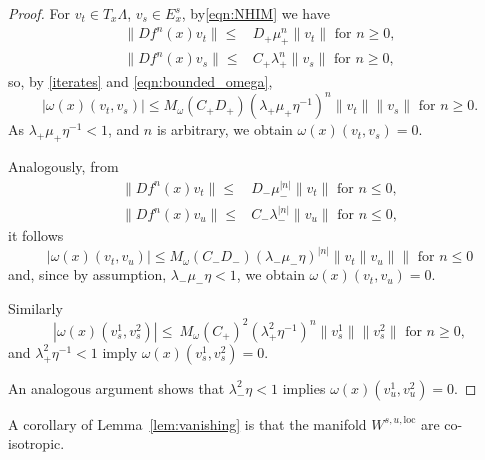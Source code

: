 \documentclass[11pt]{amsart}
\theoremstyle{definition}
\theoremstyle{remark}
\numberwithin{equation}{section}
\begin{document}
\begin{proof}

For $v_t\in T_x\Lambda$, $v_s\in E^s_x$, by\eqref{eqn:NHIM} we have
\begin{equation}\begin{split}
\|Df^n(x) v_t\|\leq& D_+\mu_+^n\|v_t\|\textrm { for } n\geq 0,\\
\|Df^n(x) v_s\|\leq& C_+\lambda_+^n\|v_s\|\textrm { for } n\geq 0,
\end{split}
\end{equation}
so, by \eqref{iterates} and \eqref{eqn:bounded_omega},
\[
|\omega(x)(v_t,v_s)| \leq M_\omega  (C_+D_+)(\lambda_+\mu_+\eta^{-1})^n\|v_t\|\|v_s\| \textrm { for } n\geq 0.
\]
As $ \lambda_+\mu_+\eta^{-1} <1$, and $n$ is arbitrary, we obtain $\omega (x)(v_t,v_s)=0$.


Analogously,  from
\begin{equation}\begin{split}
\|Df^n(x) v_t\|\leq& D_-\mu_-^{|n|}\|v_t\|\textrm { for } n\leq 0,\\
\|Df^n(x) v_u\|\leq& C_-\lambda_-^{|n|}\|v_u\|\textrm { for } n\leq 0,
\end{split}
\end{equation}
it follows
\[
|\omega(x)(v_t,v_u) | \leq M_\omega  (C_-D_-)(\lambda_- \mu_- \eta )^{|n|}\|v_t\|v_u\|\| \textrm{ for } n\leq 0
\]
and, since by assumption, $ \lambda_- \mu_- \eta   <1$,
we obtain $\omega(x)(v_t,v_u)=0$.


Similarly
\[
|\omega(x)(v^1_s,v^2_s)| \leq\ M_\omega (C_+)^2(\lambda_+^2 \eta^{-1} )^{n }\|v^1_s\|\|v^2_s\| \textrm{ for } n\geq 0,
\]
and $ \lambda_+^2 \eta^{-1} <1$ imply
$\omega(x)(v^1_s,v^2_s)=0$.

An analogous argument shows that $ \lambda_-^2 \eta   < 1$ implies $\omega(x)(v^1_u,v^2_u)=0$.
\end{proof}

A corollary of Lemma~\ref{lem:vanishing} is that
the manifold $W^{s,u, \textrm{loc}} $ are co-isotropic.
\end{document}
